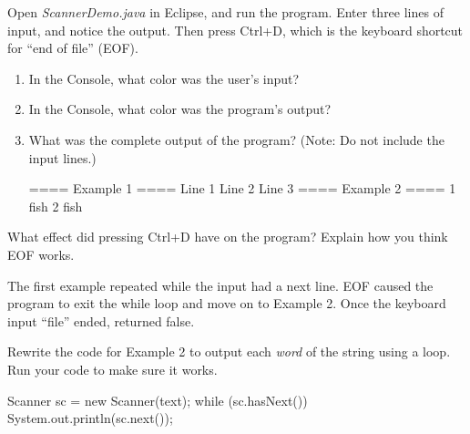 \newpage

\Q \label{run1}
Open \textit{ScannerDemo.java} in Eclipse, and run the program.
Enter three lines of input, and notice the output.
Then press \textsf{Ctrl+D}, which is the keyboard shortcut for ``end of file'' (EOF).

\begin{enumerate}

\item In the Console, what color was the user's input? 

\item In the Console, what color was the program's output? 

\item What was the complete output of the program? (Note: Do not include the input lines.)

\begin{answer}[12em]
\begin{javaans}
==== Example 1 ====
Line 1
Line 2
Line 3
==== Example 2 ====
1
fish
2
fish
\end{javaans}
\end{answer}

\end{enumerate}
\vspace{-1em}


\Q What effect did pressing \textsf{Ctrl+D} have on the program?
Explain how you think EOF works.

\begin{answer}[5em]
The first example repeated while the input had a next line.
EOF caused the program to exit the while loop and move on to Example 2.
Once the keyboard input ``file'' ended,  returned false.
\end{answer}


\Q \label{key1}
Rewrite the code for Example 2 to output each \textit{word} of the string using a  loop.
Run your code to make sure it works.

\begin{answer}[6em]
\begin{javaans}
Scanner sc = new Scanner(text);
while (sc.hasNext()) {
    System.out.println(sc.next());
}
\end{javaans}
\end{answer}
